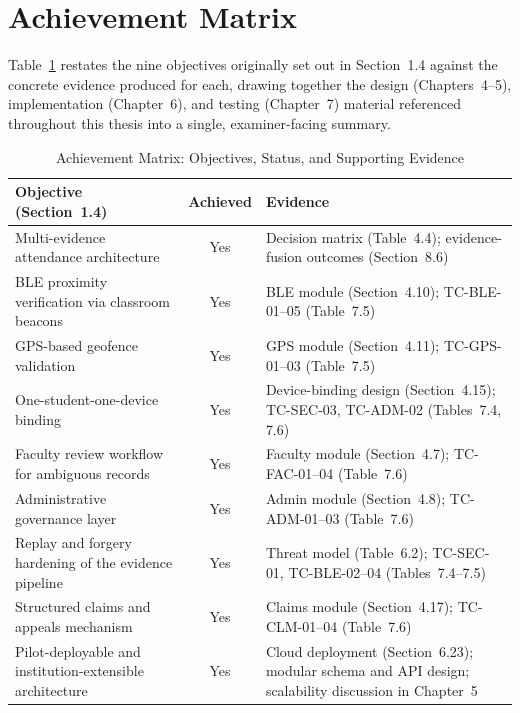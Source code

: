 \documentclass[12pt, a4paper, oneside]{report}
\begin{document}
\section{Achievement Matrix}
\label{sec:achievement-matrix}

Table~\ref{tab:achievement-matrix} restates the nine objectives originally set out in Section~1.4 against the concrete evidence produced for each, drawing together the design (Chapters~4--5), implementation (Chapter~6), and testing (Chapter~7) material referenced throughout this thesis into a single, examiner-facing summary.

\begin{table}[htbp]
\centering
\caption{Achievement Matrix: Objectives, Status, and Supporting Evidence}
\label{tab:achievement-matrix}
\small
\begin{tabularx}{\textwidth}{|X|c|X|}
\hline
\textbf{Objective (Section~1.4)} & \textbf{Achieved} & \textbf{Evidence} \\
\hline
Multi-evidence attendance architecture & Yes & Decision matrix (Table~4.4); evidence-fusion outcomes (Section~8.6) \\
\hline
BLE proximity verification via classroom beacons & Yes & BLE module (Section~4.10); TC-BLE-01--05 (Table~7.5) \\
\hline
GPS-based geofence validation & Yes & GPS module (Section~4.11); TC-GPS-01--03 (Table~7.5) \\
\hline
One-student-one-device binding & Yes & Device-binding design (Section~4.15); TC-SEC-03, TC-ADM-02 (Tables~7.4, 7.6) \\
\hline
Faculty review workflow for ambiguous records & Yes & Faculty module (Section~4.7); TC-FAC-01--04 (Table~7.6) \\
\hline
Administrative governance layer & Yes & Admin module (Section~4.8); TC-ADM-01--03 (Table~7.6) \\
\hline
Replay and forgery hardening of the evidence pipeline & Yes & Threat model (Table~6.2); TC-SEC-01, TC-BLE-02--04 (Tables~7.4--7.5) \\
\hline
Structured claims and appeals mechanism & Yes & Claims module (Section~4.17); TC-CLM-01--04 (Table~7.6) \\
\hline
Pilot-deployable and institution-extensible architecture & Yes & Cloud deployment (Section~6.23); modular schema and API design; scalability discussion in Chapter~5 \\
\hline
\end{tabularx}
\end{table}
\end{document}
